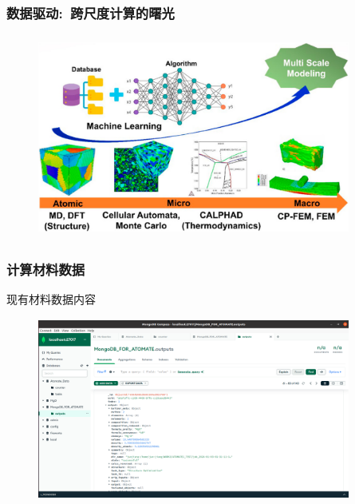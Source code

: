 \frame
{
	\frametitle{数据驱动:~跨尺度计算的曙光}
\begin{figure}[h!]
\vspace*{-0.15in}
\centering
\includegraphics[height=2.65in,width=4.05in,viewport=0 0 1179 721,clip]{Figures/Schematic_flow-of-multi_scale-modelling.png}
\label{Data_for-Machine-Leaning}
\end{figure}
}

\frame
{
	\frametitle{计算材料数据}
	现有材料数据内容
\begin{figure}[h!]
\vspace*{-0.15in}
\centering
\includegraphics[height=2.35in,width=4.05in,viewport=0 0 1529 873,clip]{Figures/Database_Materials.png}
\label{DataBase_Materials}
\end{figure}
}

